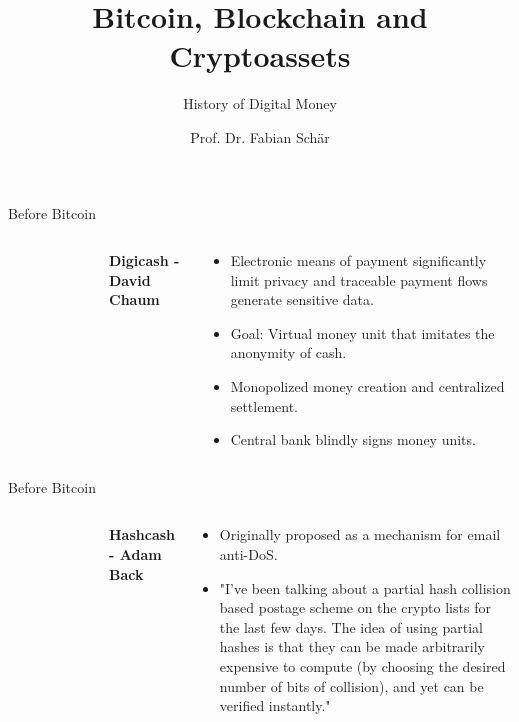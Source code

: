 \documentclass[]{beamer}
\title{Bitcoin, Blockchain and Cryptoassets}
\subtitle{History of Digital Money}
\author{Prof. Dr. Fabian Schär}
\institute{University of Basel}
\begin{document}
\thispagestyle{empty}
\begin{frame}[noframenumbering]
	\titlepage
\end{frame}



\begin{frame}{Before Bitcoin}
\begin{columns}
		\begin{figure}
			\begin{tikzpicture}[scale=1]
					
			\end{tikzpicture}
		\end{figure}
		\textbf{Digicash - David Chaum}
		\vspace{0.5em}
		\begin{small}
		\begin{itemize}
			\item Electronic means of payment significantly limit privacy and traceable payment flows generate sensitive data.
			\item Goal: Virtual money unit that imitates the anonymity of cash.
			\item Monopolized money creation and centralized settlement.
			\item Central bank blindly signs money units.
		\end{itemize}
		\end{small}	
\end{columns}
\end{frame}



\begin{frame}{Before Bitcoin}
\begin{columns}
\begin{figure}
	\begin{tikzpicture}[scale=1]
			
	\end{tikzpicture}
\end{figure}
	\textbf{Hashcash - Adam Back}
	\vspace{0.5em}
	\begin{small}
	\begin{itemize}
		\item Originally proposed as a mechanism for email anti-DoS.
		\item "I've been talking about a partial hash collision based postage scheme on the crypto lists for the last few days. The idea of using partial hashes is that they can be made arbitrarily expensive to compute (by choosing the desired number of bits of collision), and yet can be verified instantly."
	\end{itemize}
	\end{small}
\end{columns}
\end{frame}
\end{document}
